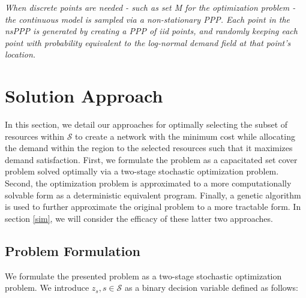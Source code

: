 \documentclass[onecolumn,draftcls]{IEEEtran}
\begin{document}
\textit{When discrete points are needed - such as set M for the optimization problem - the continuous model is sampled via a non-stationary PPP.  Each point in the nsPPP is generated by creating a PPP of iid points, and randomly keeping each point with probability equivalent to the log-normal demand field at that point's location.}
\fi

\section{Solution Approach} \label{approach}

In this section, we detail our approaches for optimally selecting the subset of resources within $\mathcal{S}$ to create a network with the minimum cost while allocating the demand within the region to the selected resources such that it maximizes demand satisfaction.  First, we formulate the problem as a capacitated set cover problem solved optimally via a two-stage stochastic optimization problem.  Second, the optimization problem is approximated to a more computationally solvable form as a deterministic equivalent program.  Finally, a genetic algorithm is used to further approximate the original problem to a more tractable form.  In section \ref{sim}, we will consider the efficacy of these latter two approaches.


\subsection{Problem Formulation} \label{stoch}


We formulate the presented problem as a two-stage stochastic optimization problem.  We introduce $z_s, s \in \mathcal{S}$ as a binary decision variable defined as follows:
\end{document}
